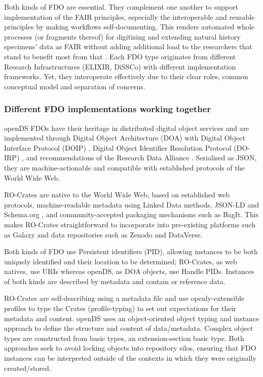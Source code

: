 Both kinds of FDO are essential. They complement one another to support
implementation of the FAIR principles, especially the interoperable and
reusable principles by making workflows self-documenting. This renders
automated whole processes (or fragments thereof) for digitizing and
extending natural history specimens' data as FAIR without adding
additional load to the researchers that stand to benefit most from that
\cite{Wittenburg 2022b}. Each FDO type originates from different Research
Infrastructures (ELIXIR, DiSSCo) with different implementation
frameworks. Yet, they interoperate effectively due to their clear roles,
common conceptual model and separation of concerns.

\subsubsection{Different FDO implementations working together}\label{ch8:different-fdo-implementations-working-together}

openDS FDOs have their heritage in distributed digital object services
\cite{Kahn 2006} and are implemented through Digital Object Architecture (DOA)
\cite{DONA 2021} with Digital Object Interface Protocol (DOIP) \cite{DONA 2018}, Digital
Object Identifier Resolution Protocol (DO-IRP) \cite{Sun 2003b}, and
recommendations of the Research Data Alliance \cite{Islam 2020}. Serialised as
JSON, they are machine-actionable and compatible with established
protocols of the World Wide Web.

RO-Crates are native to the World Wide Web, based on established web
protocols, machine-readable metadata using Linked Data methods, JSON-LD and Schema.org \cite{Bechhofer 2013,Soiland-Reyes 2022a}, and community-accepted
packaging mechanisms such as BagIt. This makes RO-Crates straightforward
to incorporate into pre-existing platforms such as Galaxy and data
repositories such as Zenodo and DataVerse.

Both kinds of FDO use Persistent identifiers (PID), allowing instances
to be both uniquely identified and their location to be determined;
RO-Crates, as web natives, use URIs whereas openDS, as DOA objects, use
Handle PIDs. Instances of both kinds are described by metadata and
contain or reference data.

RO-Crates are self-describing using a metadata file and use
openly-extensible profiles to type the Crates (profile-typing) to set
out expectations for their metadata and content. openDS uses an
object-oriented object typing and instance approach to define the
structure and content of data/metadata. Complex object types are
constructed from basic types, an extension-section basic type. Both
approaches seek to avoid locking objects into repository silos, ensuring
that FDO instances can be interpreted outside of the contexts in which
they were originally created/stored.


